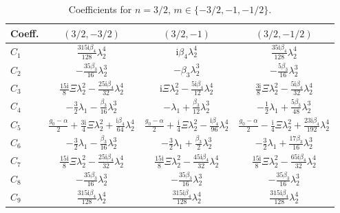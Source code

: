 \documentclass[11pt]{article}
\newcommand{\ii}{\mathrm{i}}
\begin{document}
\begin{table}[htbp]
\centering\small
\caption{Coefficients for $n=3/2$, $m\in\{-3/2,-1,-1/2\}$.}
\begin{tabular}{lccc}
\toprule
Coeff. & $(3/2,-3/2)$ & $(3/2,-1)$ & $(3/2,-1/2)$ \\
\midrule
$C_1$ & $\tfrac{315\ii\beta_4}{128}\lambda_2^4$ & $\ii\beta_4\lambda_2^4$ & $\tfrac{35\ii\beta_4}{128}\lambda_2^4$ \\
$C_2$ & $-\tfrac{35\beta_3}{16}\lambda_2^3$ & $-\beta_3\lambda_2^3$ & $-\tfrac{5\beta_3}{16}\lambda_2^3$ \\
$C_3$ & $\tfrac{15\ii}{8}\Xi\lambda_2^2-\tfrac{25\ii\beta_4}{32}\lambda_2^4$ & $\ii\Xi\lambda_2^2-\tfrac{5\ii\beta_4}{12}\lambda_2^4$ & $\tfrac{3\ii}{8}\Xi\lambda_2^2-\tfrac{5\ii\beta_4}{32}\lambda_2^4$ \\
$C_4$ & $-\tfrac32\lambda_1-\tfrac{\beta_3}{16}\lambda_2^3$ & $-\lambda_1+\tfrac{\beta_3}{12}\lambda_2^3$ & $-\tfrac12\lambda_1+\tfrac{5\beta_3}{48}\lambda_2^3$ \\
$C_5$ & $\tfrac{g_0-\alpha}{2}+\tfrac{3\ii}{4}\Xi\lambda_2^2+\tfrac{\ii\beta_4}{64}\lambda_2^4$ & $\tfrac{g_0-\alpha}{2}+\tfrac{\ii}{4}\Xi\lambda_2^2-\tfrac{\ii\beta_4}{96}\lambda_2^4$ & $\tfrac{g_0-\alpha}{2}-\tfrac{\ii}{4}\Xi\lambda_2^2+\tfrac{23\ii\beta_4}{192}\lambda_2^4$ \\
$C_6$ & $-\tfrac32\lambda_1-\tfrac{\beta_3}{16}\lambda_2^3$ & $-\tfrac32\lambda_1+\tfrac{\beta_3}{2}\lambda_2^3$ & $-\tfrac32\lambda_1+\tfrac{17\beta_3}{16}\lambda_2^3$ \\
$C_7$ & $\tfrac{15\ii}{8}\Xi\lambda_2^2-\tfrac{25\ii\beta_4}{32}\lambda_2^4$ & $\tfrac{15\ii}{8}\Xi\lambda_2^2-\tfrac{45\ii\beta_4}{32}\lambda_2^4$ & $\tfrac{15\ii}{8}\Xi\lambda_2^2-\tfrac{65\ii\beta_4}{32}\lambda_2^4$ \\
$C_8$ & $-\tfrac{35\beta_3}{16}\lambda_2^3$ & $-\tfrac{35\beta_3}{16}\lambda_2^3$ & $-\tfrac{35\beta_3}{16}\lambda_2^3$ \\
$C_9$ & $\tfrac{315\ii\beta_4}{128}\lambda_2^4$ & $\tfrac{315\ii\beta_4}{128}\lambda_2^4$ & $\tfrac{315\ii\beta_4}{128}\lambda_2^4$ \\
\bottomrule
\end{tabular}
\end{table}
\end{document}
